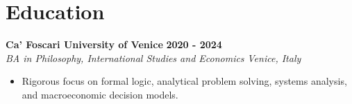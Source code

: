 \documentclass[10pt,a4paper]{article}
\newcommand{\role}[4]{%
  \textbf{#1} \hfill \textbf{#2}\\[1pt]%
  \textit{#3} \hfill \textit{#4}\\[2pt]%
}
\begin{document}
\section{Education}
\role{Ca' Foscari University of Venice}{2020 - 2024}{BA in Philosophy, International Studies and Economics}{Venice, Italy}
\begin{itemize}
  \item Rigorous focus on formal logic, analytical problem solving, systems analysis, and macroeconomic decision models.
\end{itemize}
\end{document}
